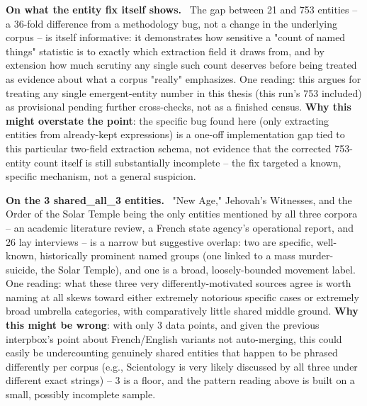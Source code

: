 \documentclass[11pt,a4paper]{article}
\newenvironment{interpbox}[1][Possible interpretation]
  {\par\vspace{6pt}\noindent{\color{interpline}\rule{\linewidth}{0.8pt}}\par\vspace{3pt}
   \noindent\small\textcolor{interpline}{\textbf{#1.}}\ \ignorespaces}
  {\par\vspace{3pt}\noindent{\color{interpline}\rule{\linewidth}{0.8pt}}\vspace{6pt}\par}
\begin{document}
\begin{interpbox}[On what the entity fix itself shows]
The gap between 21 and 753 entities -- a 36-fold difference from a
methodology bug, not a change in the underlying corpus -- is itself
informative: it demonstrates how sensitive a "count of named things"
statistic is to exactly which extraction field it draws from, and by
extension how much scrutiny any single such count deserves before being
treated as evidence about what a corpus "really" emphasizes. One
reading: this argues for treating any single emergent-entity number in
this thesis (this run's 753 included) as provisional pending further
cross-checks, not as a finished census. \textbf{Why this might overstate
the point}: the specific bug found here (only extracting entities from
already-kept expressions) is a one-off implementation gap tied to this
particular two-field extraction schema, not evidence that the corrected
753-entity count itself is still substantially incomplete -- the fix
targeted a known, specific mechanism, not a general suspicion.
\end{interpbox}

\begin{interpbox}[On the 3 shared\_all\_3 entities]
"New Age," Jehovah's Witnesses, and the Order of the Solar Temple being
the only entities mentioned by all three corpora -- an academic
literature review, a French state agency's operational report, and 26
lay interviews -- is a narrow but suggestive overlap: two are specific,
well-known, historically prominent named groups (one linked to a mass
murder-suicide, the Solar Temple), and one is a broad, loosely-bounded
movement label. One reading: what these three very differently-motivated
sources agree is worth naming at all skews toward either extremely
notorious specific cases or extremely broad umbrella categories, with
comparatively little shared middle ground. \textbf{Why this might be
wrong}: with only 3 data points, and given the previous interpbox's
point about French/English variants not auto-merging, this could easily
be undercounting genuinely shared entities that happen to be phrased
differently per corpus (e.g., Scientology is very likely discussed by
all three under different exact strings) -- 3 is a floor, and the
pattern reading above is built on a small, possibly incomplete sample.
\end{interpbox}
\end{document}
